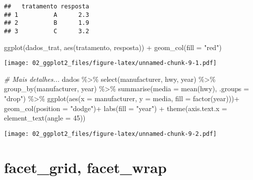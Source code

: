 \documentclass[
]{book}
\newenvironment{Shaded}{\begin{snugshade}}{\end{snugshade}}
\newcommand{\AttributeTok}[1]{\textcolor[rgb]{0.77,0.63,0.00}{#1}}
\newcommand{\CommentTok}[1]{\textcolor[rgb]{0.56,0.35,0.01}{\textit{#1}}}
\newcommand{\DecValTok}[1]{\textcolor[rgb]{0.00,0.00,0.81}{#1}}
\newcommand{\FunctionTok}[1]{\textcolor[rgb]{0.00,0.00,0.00}{#1}}
\newcommand{\NormalTok}[1]{#1}
\newcommand{\SpecialCharTok}[1]{\textcolor[rgb]{0.00,0.00,0.00}{#1}}
\newcommand{\StringTok}[1]{\textcolor[rgb]{0.31,0.60,0.02}{#1}}
\begin{document}
\begin{verbatim}
##   tratamento resposta
## 1          A      2.3
## 2          B      1.9
## 3          C      3.2
\end{verbatim}

\begin{Shaded}
\begin{Highlighting}[]
\FunctionTok{ggplot}\NormalTok{(dados\_trat, }\FunctionTok{aes}\NormalTok{(tratamento, resposta)) }\SpecialCharTok{+}
  \FunctionTok{geom\_col}\NormalTok{(}\AttributeTok{fill =} \StringTok{"red"}\NormalTok{)}
\end{Highlighting}
\end{Shaded}

\texttt{[image: 02\_ggplot2\_files/figure-latex/unnamed-chunk-9-1.pdf]}

\begin{Shaded}
\begin{Highlighting}[]
\CommentTok{\# Mais detalhes...}
\NormalTok{dados }\SpecialCharTok{\%\textgreater{}\%} \FunctionTok{select}\NormalTok{(manufacturer, hwy, year) }\SpecialCharTok{\%\textgreater{}\%} 
  \FunctionTok{group\_by}\NormalTok{(manufacturer, year) }\SpecialCharTok{\%\textgreater{}\%} 
  \FunctionTok{summarise}\NormalTok{(}\AttributeTok{media =} \FunctionTok{mean}\NormalTok{(hwy), }\AttributeTok{.groups =} \StringTok{"drop"}\NormalTok{) }\SpecialCharTok{\%\textgreater{}\%} 
  \FunctionTok{ggplot}\NormalTok{(}\FunctionTok{aes}\NormalTok{(}\AttributeTok{x =}\NormalTok{ manufacturer, }\AttributeTok{y =}\NormalTok{ media, }\AttributeTok{fill =} \FunctionTok{factor}\NormalTok{(year)))}\SpecialCharTok{+}
  \FunctionTok{geom\_col}\NormalTok{(}\AttributeTok{position =} \StringTok{"dodge"}\NormalTok{)}\SpecialCharTok{+}
  \FunctionTok{labs}\NormalTok{(}\AttributeTok{fill =} \StringTok{"year"}\NormalTok{) }\SpecialCharTok{+}
  \FunctionTok{theme}\NormalTok{(}\AttributeTok{axis.text.x =} \FunctionTok{element\_text}\NormalTok{(}\AttributeTok{angle =} \DecValTok{45}\NormalTok{))}
\end{Highlighting}
\end{Shaded}

\texttt{[image: 02\_ggplot2\_files/figure-latex/unnamed-chunk-9-2.pdf]}

\hypertarget{facet_grid-facet_wrap}{%
\section{facet\_grid, facet\_wrap}\label{facet_grid-facet_wrap}}
\end{document}
